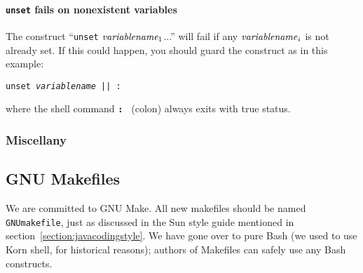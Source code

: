 \paragraph{{\bf \tt unset} fails on nonexistent variables}
The construct ``{\tt unset} \(\mbox{\it variablename}_1\)...'' will
fail if any \(\mbox{{\it variablename\/}}_i\) is not already set.
If this could happen, you should guard the construct as in this
example:
\begin{example}
\tt{}unset {\it{}variablename\/} || :
\end{example} 
where the shell command {\bf \tt : } (colon) always exits with true
status.



\subsubsection{Miscellany}

\subsection{GNU Makefiles} 

We are committed to GNU Make.  All new makefiles should be named {\tt
GNUmakefile}, just as discussed in the Sun style guide mentioned in
section~\ref{section:javacodingstyle}.  We have gone over to pure Bash
(we used to use Korn shell, for historical reasons); authors of
Makefiles can safely use any Bash constructs.

